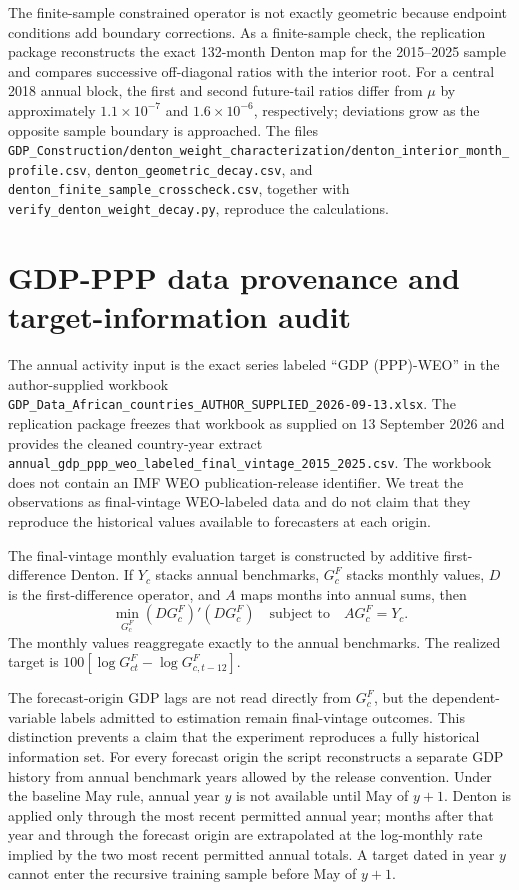 \documentclass[12pt]{article}
\begin{document}
The finite-sample constrained operator is not exactly geometric because endpoint conditions add boundary corrections. As a finite-sample check, the replication package reconstructs the exact 132-month Denton map for the 2015--2025 sample and compares successive off-diagonal ratios with the interior root. For a central 2018 annual block, the first and second future-tail ratios differ from $\mu$ by approximately $1.1\times10^{-7}$ and $1.6\times10^{-6}$, respectively; deviations grow as the opposite sample boundary is approached. The files \nolinkurl{GDP_Construction/denton_weight_characterization/denton_interior_month_profile.csv}, \nolinkurl{denton_geometric_decay.csv}, and \nolinkurl{denton_finite_sample_crosscheck.csv}, together with \nolinkurl{verify_denton_weight_decay.py}, reproduce the calculations.


\section{GDP-PPP data provenance and target-information audit}
The annual activity input is the exact series labeled ``GDP (PPP)-WEO'' in the author-supplied workbook \nolinkurl{GDP_Data_African_countries_AUTHOR_SUPPLIED_2026-09-13.xlsx}. The replication package freezes that workbook as supplied on 13 September 2026 and provides the cleaned country-year extract \nolinkurl{annual_gdp_ppp_weo_labeled_final_vintage_2015_2025.csv}. The workbook does not contain an IMF WEO publication-release identifier. We treat the observations as final-vintage WEO-labeled data and do not claim that they reproduce the historical values available to forecasters at each origin.

The final-vintage monthly evaluation target is constructed by additive first-difference Denton. If $Y_c$ stacks annual benchmarks, $G_c^F$ stacks monthly values, $D$ is the first-difference operator, and $A$ maps months into annual sums, then
\[
\min_{G_c^F}(DG_c^F)'(DG_c^F)\quad\text{subject to}\quad AG_c^F=Y_c.
\]
The monthly values reaggregate exactly to the annual benchmarks. The realized target is $100[\log G^F_{ct}-\log G^F_{c,t-12}]$.

The forecast-origin GDP lags are not read directly from $G_c^F$, but the dependent-variable labels admitted to estimation remain final-vintage outcomes. This distinction prevents a claim that the experiment reproduces a fully historical information set. For every forecast origin the script reconstructs a separate GDP history from annual benchmark years allowed by the release convention. Under the baseline May rule, annual year $y$ is not available until May of $y+1$. Denton is applied only through the most recent permitted annual year; months after that year and through the forecast origin are extrapolated at the log-monthly rate implied by the two most recent permitted annual totals. A target dated in year $y$ cannot enter the recursive training sample before May of $y+1$.
\end{document}
